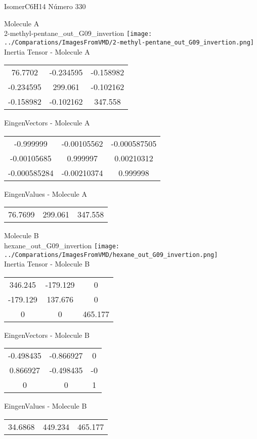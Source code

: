 \vtab[-2cm]
\begin{center}
{\large IsomerC6H14 \tab Número 330}
\end{center}
\begin{multicols}{2}
\begin{center}

Molecule A \\ 
2-methyl-pentane\_out\_G09\_invertion
\texttt{[image: ../Comparations/ImagesFromVMD/2-methyl-pentane\_out\_G09\_invertion.png]}
\\
Inertia Tensor - Molecule A \\
\vtab

\begin{tabular}{|c c c|}
76.7702	 & 	-0.234595	 & 	-0.158982	 \\
-0.234595	 & 	299.061	 & 	-0.102162	 \\
-0.158982	 & 	-0.102162	 & 	347.558
\end{tabular}

\vtab
 EingenVectors - Molecule A     \\
\vtab
\begin{tabular}{|c c c|}
-0.999999	 & 	-0.00105562	 & 	-0.000587505	 \\
-0.00105685	 & 	0.999997	 & 	0.00210312	 \\
-0.000585284	 & 	-0.00210374	 & 	0.999998
\end{tabular}

\vtab
 EingenValues - Molecule A     \\
\vtab
\begin{tabular}{|c c c|}
76.7699	 & 	299.061	 & 	347.558	 \\
\end{tabular}
\columnbreak

Molecule B \\ 
hexane\_out\_G09\_invertion
\texttt{[image: ../Comparations/ImagesFromVMD/hexane\_out\_G09\_invertion.png]}
\\
Inertia Tensor - Molecule B \\
\vtab

\begin{tabular}{|c c c|}
346.245	 & 	-179.129	 & 	0	 \\
-179.129	 & 	137.676	 & 	0	 \\
0	 & 	0	 & 	465.177
\end{tabular}

\vtab
 EingenVectors - Molecule B     \\
\vtab
\begin{tabular}{|c c c|}
-0.498435	 & 	-0.866927	 & 	0	 \\
0.866927	 & 	-0.498435	 & 	-0	 \\
0	 & 	0	 & 	1
\end{tabular}

\vtab
 EingenValues - Molecule B     \\
\vtab
\begin{tabular}{|c c c|}
34.6868	 & 	449.234	 & 	465.177	 \\
\end{tabular}

\end{center}
\end{multicols}
